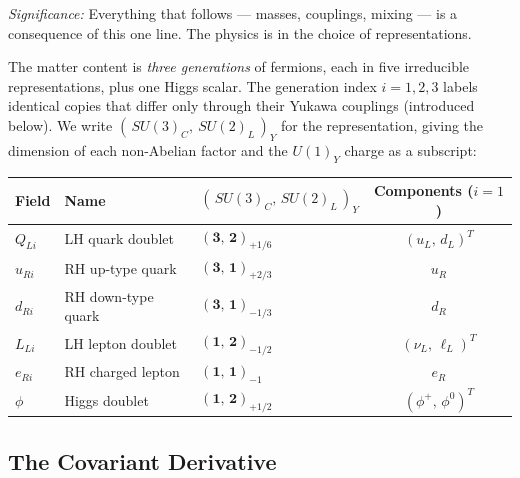 \textit{Significance:} Everything that follows --- masses, couplings,
mixing --- is a consequence of this one line. The physics is in the
choice of representations.

The matter content is \emph{three generations} of fermions, each in
five irreducible representations, plus one Higgs scalar. The
generation index $i = 1,2,3$ labels identical copies that differ only
through their Yukawa couplings (introduced below). We write
$(\,SU(3)_C,\ SU(2)_L\,)_Y$ for the representation, giving the dimension
of each non-Abelian factor and the $U(1)_Y$ charge as a subscript:

\begin{center}
\renewcommand{\arraystretch}{1.4}
\begin{tabular}{@{}lllc@{}}
  \toprule
  Field & Name & $(\,SU(3)_C,\,SU(2)_L\,)_Y$ & Components ($i=1$)\\
  \midrule
  $Q_{Li}$ & LH quark doublet      & $(\mathbf3,\,\mathbf2)_{+1/6}$ & $(u_L,\,d_L)^T$\\
  $u_{Ri}$ & RH up-type quark      & $(\mathbf3,\,\mathbf1)_{+2/3}$ & $u_R$\\
  $d_{Ri}$ & RH down-type quark    & $(\mathbf3,\,\mathbf1)_{-1/3}$ & $d_R$\\
  $L_{Li}$ & LH lepton doublet     & $(\mathbf1,\,\mathbf2)_{-1/2}$ & $(\nu_{L},\,\ell_L)^T$\\
  $e_{Ri}$ & RH charged lepton     & $(\mathbf1,\,\mathbf1)_{-1}$   & $e_R$\\
  \midrule
  $\phi$   & Higgs doublet         & $(\mathbf1,\,\mathbf2)_{+1/2}$ & $(\phi^+,\,\phi^0)^T$\\
  \bottomrule
\end{tabular}
\end{center}


\subsection{The Covariant Derivative}\label{subsec:lec20:covd}

